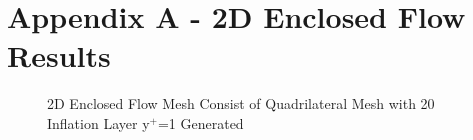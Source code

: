 \newpage
\flushleft
\section*{{Appendix A - 2D Enclosed Flow Results}} 
\label{sec: appendix_a}


\begin{figure}[!ht]
    \noindent{}
    \caption{2D Enclosed Flow Mesh Consist of Quadrilateral Mesh with 20 Inflation Layer y$^+$=1 Generated} 
    \label{fig:2D_EN_MESH}
\end{figure}

